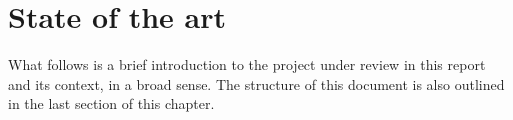 \chapter{State of the art} %
\label{Chapter3StateOfTheArt} %


What follows is a brief introduction to the project under review in this report and its context,
in a broad sense. The structure of this document is also outlined in the last section of this chapter.



